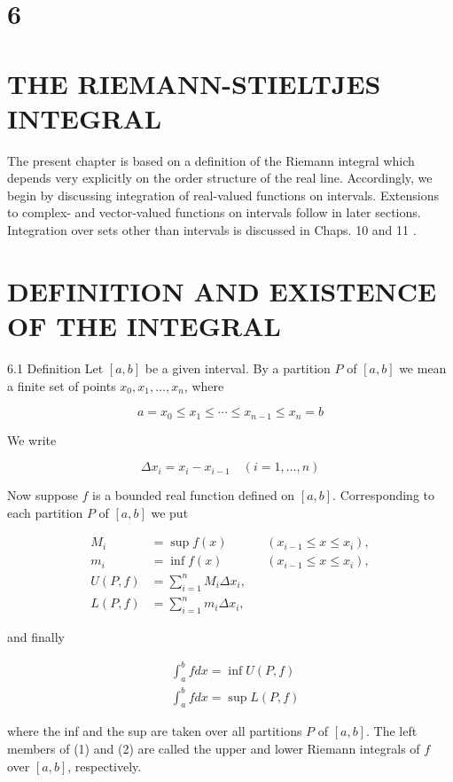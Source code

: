 \documentclass[10pt]{article}
\begin{document}
\section{6}
\section{THE RIEMANN-STIELTJES INTEGRAL}
The present chapter is based on a definition of the Riemann integral which depends very explicitly on the order structure of the real line. Accordingly, we begin by discussing integration of real-valued functions on intervals. Extensions to complex- and vector-valued functions on intervals follow in later sections. Integration over sets other than intervals is discussed in Chaps. 10 and 11 .

\section{DEFINITION AND EXISTENCE OF THE INTEGRAL}
6.1 Definition Let $[a, b]$ be a given interval. By a partition $P$ of $[a, b]$ we mean a finite set of points $x_{0}, x_{1}, \ldots, x_{n}$, where

$$
a=x_{0} \leq x_{1} \leq \cdots \leq x_{n-1} \leq x_{n}=b
$$

We write

$$
\Delta x_{i}=x_{i}-x_{i-1} \quad(i=1, \ldots, n)
$$

Now suppose $f$ is a bounded real function defined on $[a, b]$. Corresponding to each partition $P$ of $[a, b]$ we put

$$
\begin{array}{rlrl}
M_{i} & =\sup f(x) & & \left(x_{i-1} \leq x \leq x_{i}\right), \\
m_{i} & =\inf f(x) & & \left(x_{i-1} \leq x \leq x_{i}\right), \\
U(P, f) & =\sum_{i=1}^{n} M_{i} \Delta x_{i}, & \\
L(P, f) & =\sum_{i=1}^{n} m_{i} \Delta x_{i}, &
\end{array}
$$

and finally

$$
\begin{aligned}
& \int_{a}^{b} f d x=\inf U(P, f) \\
& \int_{a}^{b} f d x=\sup L(P, f)
\end{aligned}
$$

where the inf and the sup are taken over all partitions $P$ of $[a, b]$. The left members of (1) and (2) are called the upper and lower Riemann integrals of $f$ over $[a, b]$, respectively.
\end{document}

